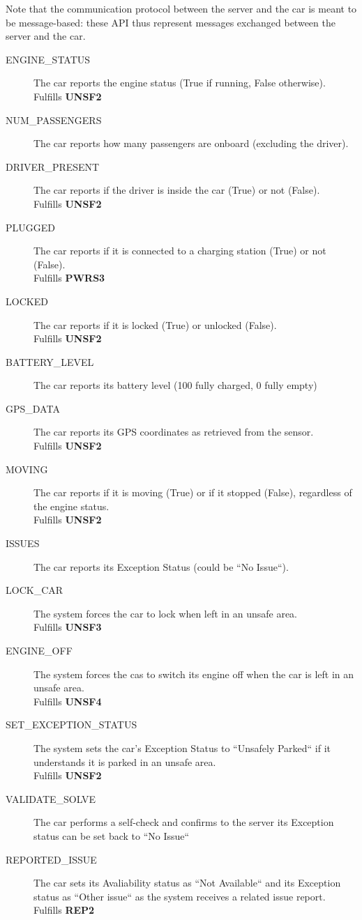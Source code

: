 \documentclass[11pt]{article} %
\begin{document}
\begin{description}
Note that the communication protocol between the server and the car is meant to be message-based: these API thus represent messages exchanged between the server and the car.
\begin{description}
	\item[ENGINE\_STATUS] The car reports the engine status (True if running, False otherwise). \\ Fulfills \textbf{UNSF2}
	\item[NUM\_PASSENGERS] The car reports how many passengers are onboard (excluding the driver).
	\item[DRIVER\_PRESENT] The car reports if the driver is inside the car (True) or not (False). \\ Fulfills \textbf{UNSF2}
	\item[PLUGGED] The car reports if it is connected to a charging station (True) or not (False). \\ Fulfills \textbf{PWRS3}
	\item[LOCKED] The car reports if it is locked (True) or unlocked (False). \\ Fulfills \textbf{UNSF2}
	\item[BATTERY\_LEVEL] The car reports its battery level (100 fully charged, 0 fully empty)
	\item[GPS\_DATA] The car reports its GPS coordinates as retrieved from the sensor. \\ Fulfills \textbf{UNSF2}
	\item[MOVING] The car reports if it is moving (True) or if it stopped (False), regardless of the engine status. \\ Fulfills \textbf{UNSF2}
	\item[ISSUES] The car reports its Exception Status (could be ``No Issue``).

	\item[LOCK\_CAR] The system forces the car to lock when left in an unsafe area. \\ Fulfills \textbf{UNSF3}
	\item[ENGINE\_OFF] The system forces the cas to switch its engine off when the car is left in an unsafe area.\\ Fulfills \textbf{UNSF4}
	\item[SET\_EXCEPTION\_STATUS] The system sets the car's Exception Status to ``Unsafely Parked`` if it understands it is parked in an unsafe area. \\ Fulfills \textbf{UNSF2}
	
	\item[VALIDATE\_SOLVE] The car performs a self-check and confirms to the server its Exception status can be set back to ``No Issue``
	\item[REPORTED\_ISSUE] The car sets its Avaliability status as ``Not Available`` and its Exception status as ``Other issue`` as the system receives a related issue report. \\ Fulfills \textbf{REP2}
\end{description}


\end{description}
\end{document}
